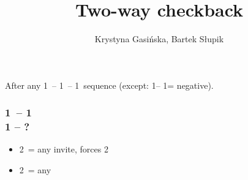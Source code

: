\documentclass[12pt, a4paper]{article}
\title{Two-way checkback}
\author{Krystyna Gasińska, Bartek Słupik}
\begin{document}
\maketitle


After any 1\ -- 1\ -- 1\ sequence (except:
1\clubs -- 1\diams = negative).

\subsubsection*{1\ -- 1 \\ 1 -- ?}
\begin{itemize}
    \item 2\clubs\ = any invite, forces 2\diams
    \item 2\diams\ = any \gf
\end{itemize}

\end{document}
